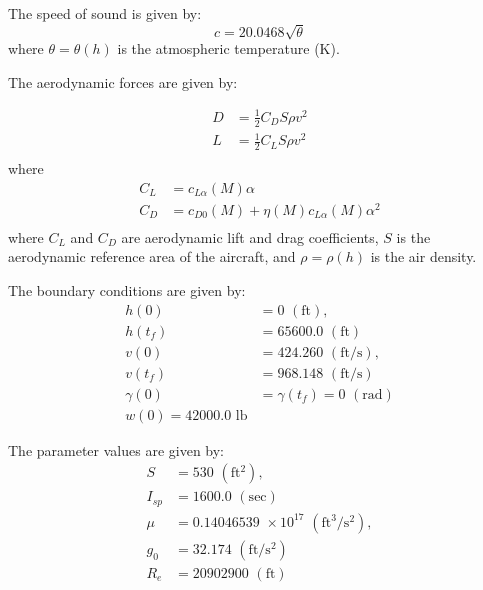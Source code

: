 \documentclass[a4paper,11pt]{report}    %
\begin{document}
The speed of sound is given by:
\begin{equation}
  c=  20.0468 \sqrt{\theta}
\end{equation}
where $\theta=\theta(h)$ is the atmospheric temperature (K).

The aerodynamic forces are given by:

\begin{equation}
 \begin{aligned}
   D &= \frac{1}{2} C_D S \rho v^2 \\
   L &= \frac{1}{2} C_L S \rho v^2 \\
 \end{aligned}
\end{equation}
where
\begin{equation}
 \begin{aligned}
   C_L &= c_{L\alpha}(M) \alpha \\
   C_D &= c_{D0}(M) + \eta(M) c_{L\alpha}(M) \alpha^2 \\
 \end{aligned}
\end{equation}
where  $C_L$ and $C_D$ are aerodynamic lift and drag coefficients, $S$ is the
aerodynamic reference area of the aircraft, and $\rho=\rho(h)$ is the air density.

The boundary conditions are given by:
\begin{equation}
  \begin{aligned}
     h(0) & =0 \,\,\mathrm{(ft)}, \\
     h(t_f) &= 65600.0 \,\,\mathrm{(ft)} \\
     v(0) &= 424.260 \,\,\mathrm{(ft/s)}, \\
     v(t_f) & =968.148 \,\,\mathrm{(ft/s)} \\
     \gamma(0) &= \gamma(t_f)= 0 \,\,\mathrm{(rad)}\\
     w(0) = 42000.0 \,\,\mathrm{lb}
  \end{aligned}
\end{equation}

The parameter values are given by:
\begin{equation}
  \begin{aligned}
     S & = 530 \,\,\mathrm{(ft^2)}, \\
     I_{sp} &= 1600.0 \,\,\mathrm{(sec)} \\
     \mu &= 0.14046539 \,\,\times 10 ^{17} \,\,\mathrm{(ft^3/s^2)}, \\
     g_0 & = 32.174 \,\,\mathrm{(ft/s^2)} \\
     R_e &= 20902900 \,\,\mathrm{(ft)}\\
  \end{aligned}
\end{equation}
\end{document}
